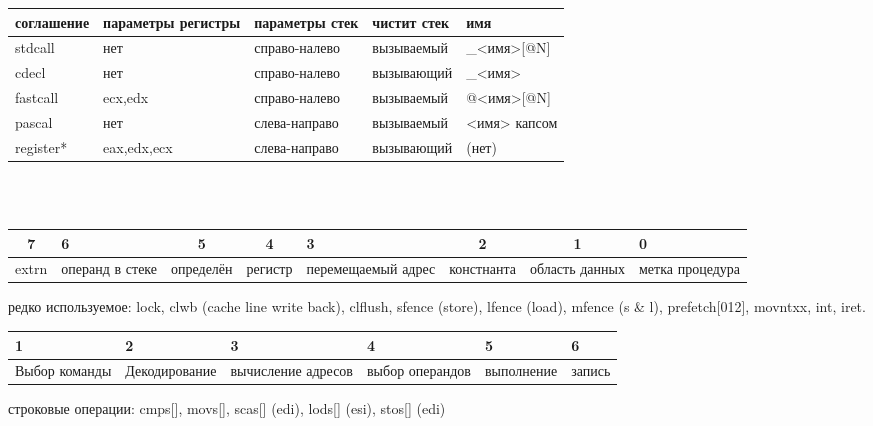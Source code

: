 \documentclass[a4paper,10pt]{article}
\begin{document}
\begin{tabularx}{\textwidth}{|X|X|X|X|X|}
    \hline
    соглашение & параметры регистры & параметры стек & чистит стек & имя \\
    \hline
    stdcall & нет & справо-налево & вызываемый & \_<имя>[@N] \\
    \hline
    cdecl & нет & справо-налево & вызывающий & \_<имя> \\
    \hline
    fastcall & ecx,edx & справо-налево & вызываемый & @<имя>[@N] \\
    \hline
    pascal & нет & слева-направо & вызываемый & <имя> капсом \\
    \hline
    register* & eax,edx,ecx  & слева-направо & вызывающий & (нет) \\
    \hline
\end{tabularx} \\
\\
\begin{tabularx}{\textwidth}{|c|X|c|c|X|c|c|X|}
\hline
7&6&5&4&3&2&1&0 \\
\hline
extrn&операнд в стеке&определён&регистр&перемещаемый адрес&констнанта&область данных&метка процедура \\
\hline
\end{tabularx}
редко используемое: lock, clwb (cache line write back), clflush, sfence (store), lfence (load), mfence (s \& l), prefetch[012], movntxx, int, iret. \\
\begin{tabularx}{\textwidth}{|X|X|X|X|X|X|}
    \hline
    1&2&3&4&5&6 \\
    \hline
    Выбор команды&Декодирование&вычисление адресов&выбор операндов&выполнение&запись \\
    \hline
\end{tabularx}
строковые операции: cmps[], movs[], scas[] (edi), lods[] (esi), stos[] (edi)
\end{document}
